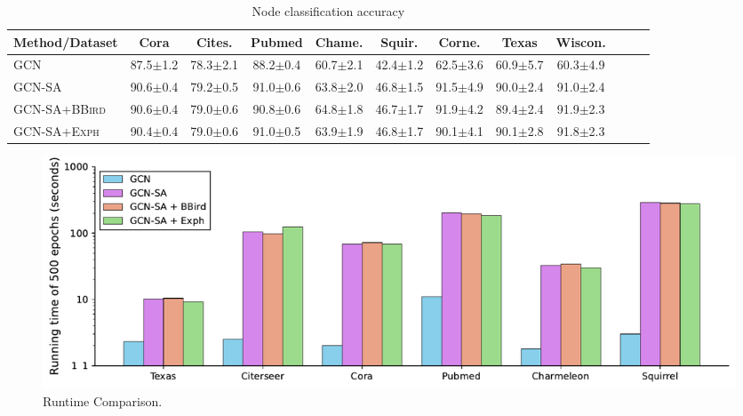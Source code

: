 \begin{table}
  \caption{Node classification accuracy}
  \label{tab:sample}
  \setlength\tabcolsep{1.5pt}
  \centering
  \begin{tabular}{l c c c c c c c c c c c }
    \toprule
    \textbf{Method/Dataset} &
    Cora & Cites. & Pubmed & Chame. & 
    Squir. & Corne. & Texas & Wiscon. \\
    \midrule
    \textsc{GCN} &
    87.5$\pm$1.2 & 78.3$\pm$2.1 & 88.2$\pm$0.4 & 60.7$\pm$2.1 &
    42.4$\pm$1.2 & 62.5$\pm$3.6 & 60.9$\pm$5.7 & 60.3$\pm$4.9 \\
    \textsc{GCN-SA} &
    90.6$\pm$0.4 & 79.2$\pm$0.5 & 91.0$\pm$0.6 & 63.8$\pm$2.0  &
    46.8$\pm$1.5 & 91.5$\pm$4.9 & 90.0$\pm$2.4 & 91.0$\pm$2.4 \\
    \textsc{GCN-SA+BBird} &
    90.6$\pm$0.4 & 79.0$\pm$0.6 & 90.8$\pm$0.6 & 64.8$\pm$1.8  &
    46.7$\pm$1.7 & 91.9$\pm$4.2 & 89.4$\pm$2.4 & 91.9$\pm$2.3 \\
    \textsc{GCN-SA+Exph} &
    90.4$\pm$0.4 & 79.0$\pm$0.6 & 91.0$\pm$0.5 & 63.9$\pm$1.9  &
    46.8$\pm$1.7 & 90.1$\pm$4.1 & 90.1$\pm$2.8 & 91.8$\pm$2.3 \\
    \bottomrule
  \end{tabular}
\end{table}

\begin{figure}
  \centering
  \includegraphics[page=1, width=\linewidth]{src/time_complexity.pdf}
  \caption{Runtime Comparison.}
  \label{fig:sample}
\end{figure}

